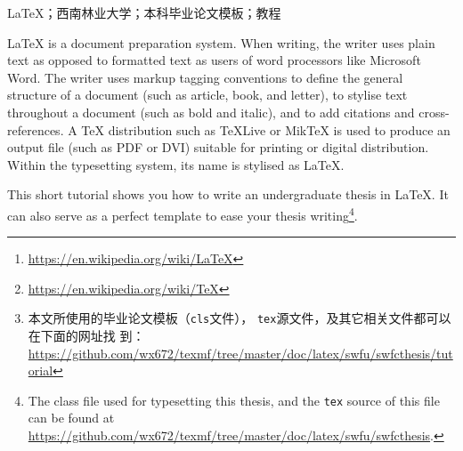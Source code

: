 \documentclass{swfuthesis}
\begin{document}
\maketitle %

\frontmatter

\begin{abstract} %
  \LaTeX{}\footnote{\url{https://en.wikipedia.org/wiki/LaTeX}}是一种基于
  \TeX{}\footnote{\url{https://en.wikipedia.org/wiki/TeX}}文件格式的排版系统，由美国电脑学
  家莱斯利·兰伯特在20世纪80年代初期开发。利用这种格式，即使用户没有排版和程序设计的知识，也
  可以充分利用TEX所提供的强大功能，在几天，甚至几小时内生成很多具有书籍质量的印刷品。对于生成复杂表格和数学公式，
  这一点表现得尤为突出。因此它非常适用于生成高印刷质量的科技和数学类文档。这个系统同样适用
  于生成从简单如信件到完整如书籍的所有种类的文档\cite{wiki:latexcn}。

  本文对如何利用\LaTeX{}来撰写西南林业大学本科毕业论文做一个简要的介绍。读者也可以将本文作
  为毕业论文模板来使用\footnote{本文所使用的毕业论文模板（\texttt{cls}文件），
    \texttt{tex}源文件，及其它相关文件都可以在下面的网址找
    到：\url{https://github.com/wx672/texmf/tree/master/doc/latex/swfu/swfcthesis/tutorial}}。
\end{abstract}

\begin{keyword} %
  \LaTeX{}；西南林业大学；本科毕业论文模板；教程
\end{keyword}

\begin{EAbstract} %
  \LaTeX{} is a document preparation system. When writing, the writer uses plain text as
  opposed to formatted text as users of word processors like Microsoft Word. The writer
  uses markup tagging conventions to define the general structure of a document (such as
  article, book, and letter), to stylise text throughout a document (such as bold and
  italic), and to add citations and cross-references. A \TeX{} distribution such as
  \TeX{}Live or Mik\TeX{} is used to produce an output file (such as PDF or DVI) suitable
  for printing or digital distribution. Within the typesetting system, its name is
  stylised as \LaTeX{}\cite{wiki:latex}.

  This short tutorial shows you how to write an undergraduate thesis in \LaTeX{}. It can
  also serve as a perfect template to ease your thesis writing\footnote{The class file
    used for typesetting this thesis, and the \texttt{tex} source of this file can be
    found at \url{https://github.com/wx672/texmf/tree/master/doc/latex/swfu/swfcthesis}.}.
\end{EAbstract}
\end{document}
